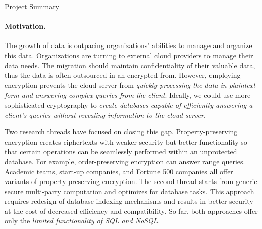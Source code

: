 \documentclass[11pt]{article}
\begin{document}
\begin{center}
\LARGE
Project Summary 
\end{center}

\vspace{-1.5em}
\noindent \hrulefill



\paragraph{Motivation.}
%
The growth of data is outpacing organizations' abilities to manage and
organize this data. Organizations are turning to external cloud providers
to manage their data needs.  
%
The migration should maintain confidentiality of their
valuable data, thus the data is often outsourced in an encrypted from. 
%
However, employing encryption prevents the cloud server
from {\em quickly processing the data in plaintext form and answering
complex queries from the client}. 
%
Ideally, we could use more sophisticated cryptography to {\em create databases
capable of efficiently answering a client's queries without revealing
information to the cloud server}.  

Two research threads have focused on closing this gap.
Property-preserving encryption creates ciphertexts with weaker
security but better functionality so that certain operations can be seamlessly
performed within an unprotected database.
%
For example,
order-preserving encryption can answer range queries. 
Academic teams,
start-up companies, and Fortune 500 companies all offer variants of
property-preserving encryption.
%
The second thread starts from generic secure multi-party computation and
optimizes for database tasks. This approach requires redesign
of database indexing mechanisms and results in better security at the cost of
decreased efficiency and compatibility. 
%
So far, both approaches offer only the {\em limited functionality
of SQL and NoSQL}. 
\end{document}

